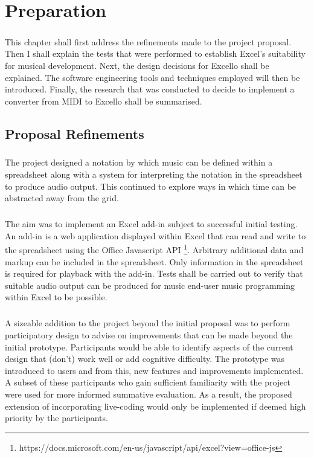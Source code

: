 
\chapter{Preparation}

\paragraph{} This chapter shall first address the refinements made to the project proposal. Then I shall explain the tests that were performed to establish Excel's suitability for musical development. Next, the design decisions for Excello shall be explained. The software engineering tools and techniques employed will then be introduced. Finally, the research that was conducted to decide to implement a converter from MIDI to Excello shall be summarised.

\section{Proposal Refinements}

\paragraph{} The project designed a notation by which music can be defined within a spreadsheet along with a system for interpreting the notation in the spreadsheet to produce audio output. This continued to explore ways in which time can be abstracted away from the grid.

\paragraph{} The aim was to implement an Excel add-in subject to successful initial testing. An add-in is a web application displayed within Excel that can read and write to the spreadsheet using the Office Javascript API \footnote{https://docs.microsoft.com/en-us/javascript/api/excel?view=office-js}. Arbitrary additional data and markup can be included in the spreadsheet. Only information in the spreadsheet is required for playback with the add-in. Tests shall be carried out to verify that suitable audio output can be produced for music end-user music programming within Excel to be possible.

\paragraph{} A sizeable addition to the project beyond the initial proposal was to perform participatory design \cite{muller:pd} to advise on improvements that can be made beyond the initial prototype. Participants would be able to identify aspects of the current design that (don't) work well or add cognitive difficulty. The prototype was introduced to users and from this, new features and improvements implemented. A subset of these participants who gain sufficient familiarity with the project were used for more informed summative evaluation. As a result, the proposed extension of incorporating live-coding would only be implemented if deemed high priority by the participants.

